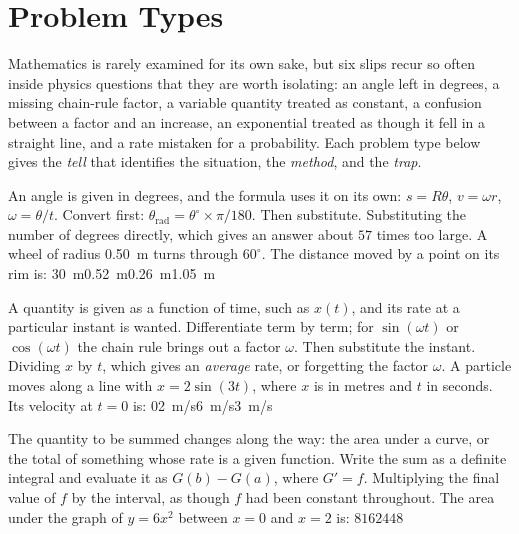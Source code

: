 \section{Problem Types}\label{sec:types0}
Mathematics is rarely examined for its own sake, but six slips recur so often inside physics questions
that they are worth isolating: an angle left in degrees, a missing chain-rule factor, a variable
quantity treated as constant, a confusion between a factor and an increase, an exponential treated as
though it fell in a straight line, and a rate mistaken for a probability. Each problem type below
gives the \emph{tell} that identifies the situation, the \emph{method}, and the \emph{trap}.

{An angle is given in degrees, and the formula uses it on its own: $s=R\theta$, $v=\omega r$,
$\omega=\theta/t$.}
{Convert first: $\theta_{\text{rad}}=\theta^\circ\times\pi/180$. Then substitute.}
{Substituting the number of degrees directly, which gives an answer about $57$ times too large.}
{A wheel of radius \SI{0.50}{m} turns through $60^\circ$. The distance moved by a point on its rim is:}
{\SI{30}{m}}{\SI{0.52}{m}}{\SI{0.26}{m}}{\SI{1.05}{m}}

{A quantity is given as a function of time, such as $x(t)$, and its rate at a particular instant is
wanted.}
{Differentiate term by term; for $\sin(\omega t)$ or $\cos(\omega t)$ the chain rule brings out a factor
$\omega$. Then substitute the instant.}
{Dividing $x$ by $t$, which gives an \emph{average} rate, or forgetting the factor $\omega$.}
{A particle moves along a line with $x=2\sin(3t)$, where $x$ is in metres and $t$ in seconds. Its
velocity at $t=0$ is:}
{$0$}{\SI{2}{m/s}}{\SI{6}{m/s}}{\SI{3}{m/s}}

{The quantity to be summed changes along the way: the area under a curve, or the total of something
whose rate is a given function.}
{Write the sum as a definite integral and evaluate it as $G(b)-G(a)$, where $G'=f$.}
{Multiplying the final value of $f$ by the interval, as though $f$ had been constant throughout.}
{The area under the graph of $y=6x^2$ between $x=0$ and $x=2$ is:}
{$8$}{$16$}{$24$}{$48$}

